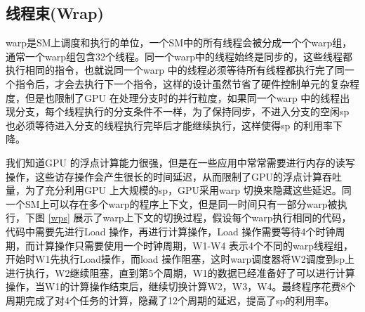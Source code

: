\subsection{线程束(Wrap)}
warp是SM上调度和执行的单位，一个SM中的所有线程会被分成一个个warp组，通常一个warp组包含32个线程。同一个warp中的线程始终是同步的，这些线程都执行相同的指令，也就说同一个warp 中的线程必须等待所有线程都执行完了同一个指令后，才会去执行下一个指令，这样的设计虽然节省了硬件控制单元的复杂程度，但是也限制了GPU 在处理分支时的并行粒度，如果同一个warp 中的线程出现分支，每个线程执行的分支条件不一样，为了保持同步，不进入分支的空闲sp 也必须等待进入分支的线程执行完毕后才能继续执行，这样使得sp 的利用率下降。

我们知道GPU 的浮点计算能力很强，但是在一些应用中常常需要进行内存的读写操作，这些访存操作会产生很长的时间延迟，从而限制了GPU的浮点计算吞吐量，为了充分利用GPU 上大规模的sp，GPU采用warp 切换来隐藏这些延迟。同一个SM上可以存在多个warp的程序上下文，但是同一时间只有一部分warp被执行，下图 \ref{wps} 展示了warp上下文的切换过程，假设每个warp执行相同的代码，代码中需要先进行Load 操作，再进行计算操作，Load 操作需要等待4个时钟周期，而计算操作只需要使用一个时钟周期，W1-W4 表示4个不同的warp线程组，开始时W1先执行Load操作，而load 操作阻塞，这时warp调度器将W2调度到sp上进行执行，W2继续阻塞，直到第5个周期，W1的数据已经准备好了可以进行计算操作，当W1的计算操作结束后，继续切换计算W2，W3，W4。最终程序花费8个周期完成了对4个任务的计算，隐藏了12个周期的延迟，提高了sp的利用率。

